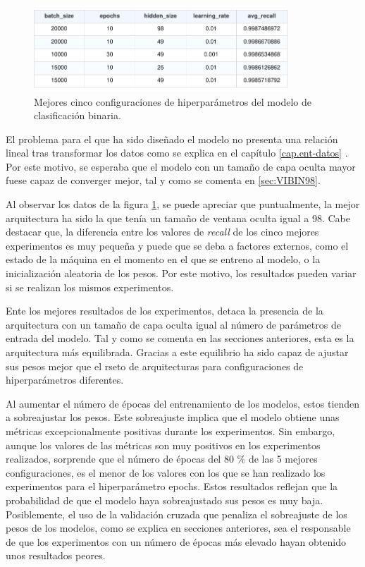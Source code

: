 \begin{figure}[H]
    \centering
    \includegraphics[width=0.85\textwidth]{./img/modelo/BINtop5.pdf}
    \caption{Mejores cinco configuraciones de hiperparámetros del modelo de clasificación binaria.}
    \label{fig:BINtop5}
\end{figure}

El problema para el que ha sido diseñado el modelo no presenta una relación lineal tras transformar los datos como se explica en el capítulo \ref{cap.ent-datos} . Por este motivo, se esperaba que el modelo con un tamaño de capa oculta mayor fuese capaz de converger mejor, tal y como se comenta en \ref{sec:VIBIN98}.

Al observar los datos de la figura \ref{fig:BINtop5}, se puede apreciar que puntualmente, la mejor arquitectura ha sido la que tenía un tamaño de ventana oculta igual a 98. Cabe destacar que, la diferencia entre los valores de \textit{recall} de los cinco mejores experimentos es muy pequeña y puede que se deba a factores externos, como el estado de la máquina en el momento en el que se entreno al modelo, o la inicialización aleatoria de los pesos. Por este motivo, los resultados pueden variar si se realizan los mismos experimentos.

Ente los mejores resultados de los experimentos, detaca la presencia de la arquitectura con un tamaño de capa oculta igual al número de parámetros de entrada del modelo. Tal y como se comenta en las secciones anteriores, esta es la arquitectura más equilibrada. Gracias a este equilibrio ha sido capaz de ajustar sus pesos mejor que el rseto de arquitecturas para configuraciones de hiperparámetros diferentes.

Al aumentar el número de épocas del entrenamiento de los modelos, estos tienden a sobreajustar los pesos. Este sobreajuste implica que el modelo obtiene unas métricas excepcionalmente positivas durante los experimentos. Sin embargo, aunque los valores de las métricas son muy positivos en los experimentos realizados, sorprende que el número de épocas del 80 \% de las 5 mejores configuraciones, es el menor de los valores con los que se han realizado los experimentos para el hiperparámetro epochs. Estos resultados reflejan que la probabilidad de que el modelo haya sobreajustado sus pesos es muy baja. Posiblemente, el uso de la validación cruzada que penaliza el sobreajuste de los pesos de los modelos, como se explica en secciones anteriores, sea el responsable de que los experimentos con un número de épocas más elevado hayan obtenido unos resultados peores.

